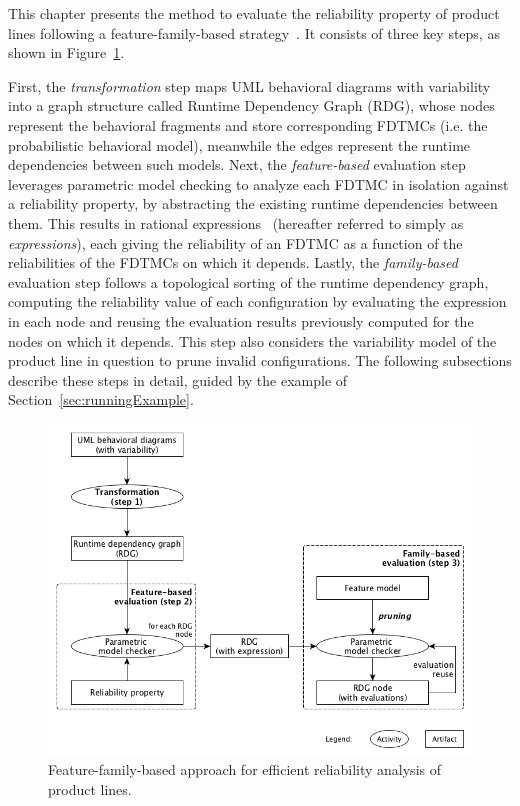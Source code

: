 

This chapter presents the method to evaluate the reliability property of
product lines following a feature-family-based
strategy~\cite{thum_classification_2014}.  It consists of three key steps, as
shown in Figure~\ref{fig:evaluationApproach}. 


First, the \emph{transformation} step maps UML behavioral diagrams with variability
into a graph structure called Runtime Dependency Graph (RDG), whose nodes
represent the behavioral fragments and store corresponding FDTMCs (i.e. the
probabilistic behavioral model), meanwhile the edges represent the runtime
dependencies between such models.  Next, the \emph{feature-based} evaluation step
leverages parametric model checking to analyze each FDTMC in isolation against a
reliability property, by abstracting the existing runtime dependencies between
them.  This results in rational expressions~\cite{HahnHZ10} (hereafter referred
to simply as \textit{expressions}), each giving the reliability of an FDTMC as a
function of the reliabilities of the FDTMCs on which it depends.  Lastly, the
\emph{family-based} evaluation step follows a topological sorting of the runtime
dependency graph, computing the reliability value of each configuration by
evaluating the expression in each node and reusing the evaluation results
previously computed for the nodes on which it depends.  This step also considers
the variability model of the product line in question to prune invalid
configurations. The following subsections describe these steps in detail, guided
by the example of Section~\ref{sec:runningExample}.


\begin{figure}[hbt]
	\centering
	\includegraphics[width=\columnwidth]{img/evaluationApproach}
	\caption{Feature-family-based approach for efficient reliability
	  analysis of product lines.} 
	\label{fig:evaluationApproach}
\end{figure}



